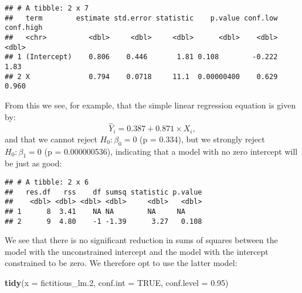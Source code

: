 \documentclass[
]{book}
\newenvironment{Shaded}{\begin{snugshade}}{\end{snugshade}}
\newcommand{\CommentTok}[1]{\textcolor[rgb]{0.56,0.35,0.01}{\textit{#1}}}
\newcommand{\DataTypeTok}[1]{\textcolor[rgb]{0.13,0.29,0.53}{#1}}
\newcommand{\DecValTok}[1]{\textcolor[rgb]{0.00,0.00,0.81}{#1}}
\newcommand{\FloatTok}[1]{\textcolor[rgb]{0.00,0.00,0.81}{#1}}
\newcommand{\KeywordTok}[1]{\textcolor[rgb]{0.13,0.29,0.53}{\textbf{#1}}}
\newcommand{\NormalTok}[1]{#1}
\newcommand{\OperatorTok}[1]{\textcolor[rgb]{0.81,0.36,0.00}{\textbf{#1}}}
\newcommand{\OtherTok}[1]{\textcolor[rgb]{0.56,0.35,0.01}{#1}}
\newcommand{\StringTok}[1]{\textcolor[rgb]{0.31,0.60,0.02}{#1}}
\begin{document}
\begin{verbatim}
## # A tibble: 2 x 7
##   term        estimate std.error statistic    p.value conf.low conf.high
##   <chr>          <dbl>     <dbl>     <dbl>      <dbl>    <dbl>     <dbl>
## 1 (Intercept)    0.806    0.446       1.81 0.108        -0.222     1.83 
## 2 X              0.794    0.0718     11.1  0.00000400    0.629     0.960
\end{verbatim}

From this we see, for example, that the simple linear regression equation is given by:
\[
\hat Y_i = 0.387 + 0.871\times X_i,  
\]
and that we cannot reject \(H_0: \beta_0=0\) (p = 0.334), but we strongly reject \(H_0:\beta_1 = 0\) (p = 0.000000536), indicating that a model with no zero intercept will be just as good:

\begin{Shaded}
\end{Shaded}

\begin{verbatim}
## # A tibble: 2 x 6
##   res.df   rss    df sumsq statistic p.value
##    <dbl> <dbl> <dbl> <dbl>     <dbl>   <dbl>
## 1      8  3.41    NA NA        NA     NA    
## 2      9  4.80    -1 -1.39      3.27   0.108
\end{verbatim}

We see that there is no significant reduction in sums of squares between the model with the unconstrained intercept and the model with the intercept constrained to be zero. We therefore opt to use the latter model:

\begin{Shaded}
\begin{Highlighting}[]
\KeywordTok{tidy}\NormalTok{(}\DataTypeTok{x =}\NormalTok{ fictitious_lm}\FloatTok{.2}\NormalTok{,}
     \DataTypeTok{conf.int =} \OtherTok{TRUE}\NormalTok{,}
     \DataTypeTok{conf.level =} \FloatTok{0.95}\NormalTok{)}
\end{Highlighting}
\end{Shaded}
\end{document}
